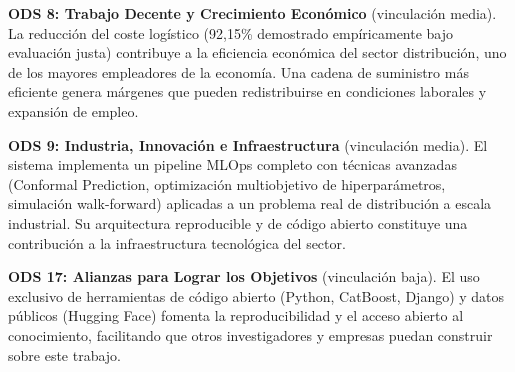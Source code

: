 \textbf{ODS 8: Trabajo Decente y Crecimiento Económico} (vinculación media). La reducción del coste logístico (92{,}15\% demostrado empíricamente bajo evaluación justa) contribuye a la eficiencia económica del sector distribución, uno de los mayores empleadores de la economía. Una cadena de suministro más eficiente genera márgenes que pueden redistribuirse en condiciones laborales y expansión de empleo.

\textbf{ODS 9: Industria, Innovación e Infraestructura} (vinculación media). El sistema implementa un pipeline MLOps completo con técnicas avanzadas (Conformal Prediction, optimización multiobjetivo de hiperparámetros, simulación walk-forward) aplicadas a un problema real de distribución a escala industrial. Su arquitectura reproducible y de código abierto constituye una contribución a la infraestructura tecnológica del sector.

\textbf{ODS 17: Alianzas para Lograr los Objetivos} (vinculación baja). El uso exclusivo de herramientas de código abierto (Python, CatBoost, Django) y datos públicos (Hugging Face) fomenta la reproducibilidad y el acceso abierto al conocimiento, facilitando que otros investigadores y empresas puedan construir sobre este trabajo.
